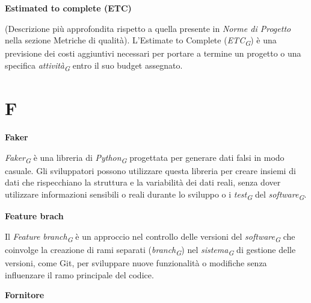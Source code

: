 \documentclass{article}
\begin{document}
\vspace{0.4cm}

\textbf{Estimated to complete (ETC)}

\vspace{0.1cm}

(Descrizione più approfondita rispetto a quella presente in \textit{Norme di Progetto} nella sezione Metriche di qualità). L'Estimate to Complete (\textit{ETC}\textsubscript{\textit{G}}) è una previsione dei costi aggiuntivi necessari per portare a termine un progetto o una specifica \textit{attività}\textsubscript{\textit{G}} entro il suo budget assegnato.

\pagebreak
\section*{F}
{}

\vspace{0.4cm}

\textbf{Faker}

\vspace{0.1cm}

\textit{Faker}\textsubscript{\textit{G}} è una libreria di \textit{Python}\textsubscript{\textit{G}} progettata per generare dati falsi in modo casuale. Gli sviluppatori possono utilizzare questa libreria per creare insiemi di dati che rispecchiano la struttura e la variabilità dei dati reali, senza dover utilizzare informazioni sensibili o reali durante lo sviluppo o i \textit{test}\textsubscript{\textit{G}} del \textit{software}\textsubscript{\textit{G}}.

\vspace{0.4cm}

\textbf{Feature brach}

\vspace{0.1cm}

Il \textit{Feature branch}\textsubscript{\textit{G}} è un approccio nel controllo delle versioni del \textit{software}\textsubscript{\textit{G}} che coinvolge la creazione di rami separati (\textit{branch}\textsubscript{\textit{G}}) nel \textit{sistema}\textsubscript{\textit{G}} di gestione delle versioni, come Git, per sviluppare nuove funzionalità o modifiche senza influenzare il ramo principale del codice.

\vspace{0.4cm}

\textbf{Fornitore}

\vspace{0.1cm}
\end{document}
